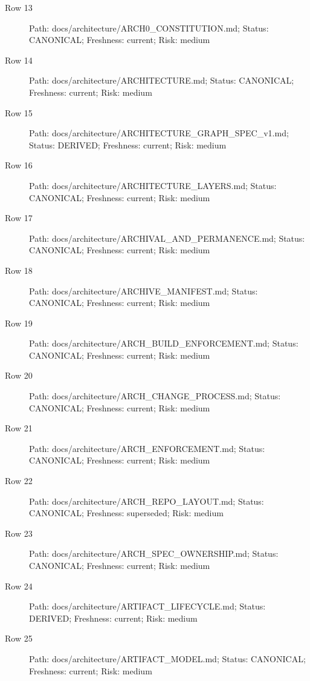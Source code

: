 \documentclass[10.5pt,a4paper,openany]{book}
\begin{document}
\begin{description}
\item[Row 13] Path: docs/\allowbreak{}architecture/\allowbreak{}ARCH0\_\allowbreak{}CONSTITUTION.\allowbreak{}md; Status: CANONICAL; Freshness: current; Risk: medium
\item[Row 14] Path: docs/\allowbreak{}architecture/\allowbreak{}ARCHITECTURE.\allowbreak{}md; Status: CANONICAL; Freshness: current; Risk: medium
\item[Row 15] Path: docs/\allowbreak{}architecture/\allowbreak{}ARCHITECTURE\_\allowbreak{}GRAPH\_\allowbreak{}SPEC\_\allowbreak{}v1.\allowbreak{}md; Status: DERIVED; Freshness: current; Risk: medium
\item[Row 16] Path: docs/\allowbreak{}architecture/\allowbreak{}ARCHITECTURE\_\allowbreak{}LAYERS.\allowbreak{}md; Status: CANONICAL; Freshness: current; Risk: medium
\item[Row 17] Path: docs/\allowbreak{}architecture/\allowbreak{}ARCHIVAL\_\allowbreak{}AND\_\allowbreak{}PERMANENCE.\allowbreak{}md; Status: CANONICAL; Freshness: current; Risk: medium
\item[Row 18] Path: docs/\allowbreak{}architecture/\allowbreak{}ARCHIVE\_\allowbreak{}MANIFEST.\allowbreak{}md; Status: CANONICAL; Freshness: current; Risk: medium
\item[Row 19] Path: docs/\allowbreak{}architecture/\allowbreak{}ARCH\_\allowbreak{}BUILD\_\allowbreak{}ENFORCEMENT.\allowbreak{}md; Status: CANONICAL; Freshness: current; Risk: medium
\item[Row 20] Path: docs/\allowbreak{}architecture/\allowbreak{}ARCH\_\allowbreak{}CHANGE\_\allowbreak{}PROCESS.\allowbreak{}md; Status: CANONICAL; Freshness: current; Risk: medium
\item[Row 21] Path: docs/\allowbreak{}architecture/\allowbreak{}ARCH\_\allowbreak{}ENFORCEMENT.\allowbreak{}md; Status: CANONICAL; Freshness: current; Risk: medium
\item[Row 22] Path: docs/\allowbreak{}architecture/\allowbreak{}ARCH\_\allowbreak{}REPO\_\allowbreak{}LAYOUT.\allowbreak{}md; Status: CANONICAL; Freshness: superseded; Risk: medium
\item[Row 23] Path: docs/\allowbreak{}architecture/\allowbreak{}ARCH\_\allowbreak{}SPEC\_\allowbreak{}OWNERSHIP.\allowbreak{}md; Status: CANONICAL; Freshness: current; Risk: medium
\item[Row 24] Path: docs/\allowbreak{}architecture/\allowbreak{}ARTIFACT\_\allowbreak{}LIFECYCLE.\allowbreak{}md; Status: DERIVED; Freshness: current; Risk: medium
\item[Row 25] Path: docs/\allowbreak{}architecture/\allowbreak{}ARTIFACT\_\allowbreak{}MODEL.\allowbreak{}md; Status: CANONICAL; Freshness: current; Risk: medium

\end{description}
\end{document}
